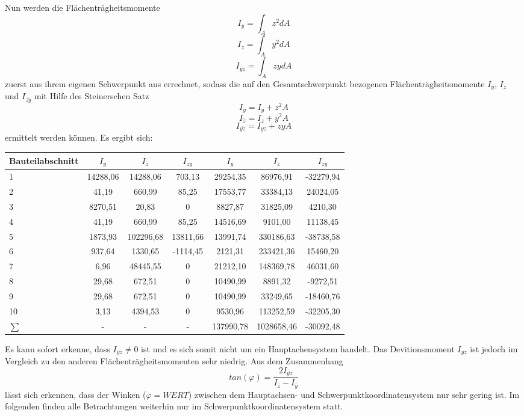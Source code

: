 Nun werden die Flächenträgheitsmomente 
\begin{equation}
	I_{y} = \int_{A}^{}z^2dA
\end{equation}
\begin{equation}
I_{z} = \int_{A}^{}y^2dA
\end{equation}
\begin{equation}
I_{yz} = \int_{A}^{}zydA
\end{equation}
 zuerst aus ihrem eigenen Schwerpunkt aus errechnet, sodass die auf den Gesamtschwerpunkt bezogenen Flächenträgheitsmomente $I_{\bar{y}}$, $I_{\bar{z}}$ und $I_{\bar{zy}}$ mit Hilfe des Steinerschen Satz
 \begin{equation}
 	I_{\bar{y}} = I_{y} + z^2A
 \end{equation}
\begin{equation}
I_{\bar{z}} = I_{z} + y^2A
\end{equation}
\begin{equation}
I_{\bar{yz}} = I_{yz} + zyA
\end{equation}
 ermittelt werden können.
Es ergibt sich:
\begin{center}

\begin{tabular}[h]{l|c|c|c||c|c|c}
Bauteilabschnitt&$I_{y}$&$I_{z}$&$I_{zy}$&$I_{\bar{y}}$&$I_{\bar{z}}$&$I_{\bar{zy}}$\\
\hline
1&14288,06&14288,06&703,13&29254,35&86976,91&-32279,94\\
2&41,19&660,99&85,25&17553,77&33384,13&24024,05\\
3&8270,51&20,83&0&8827,87&31825,09&4210,30\\
4&41,19&660,99&85,25&14516,69&9101,00&11138,45\\
5&1873,93&102296,68&13811,66&13991,74&330186,63&-38738,58\\
6&937,64&1330,65&-1114,45&2121,31&233421,36&15460,20\\
7&6,96&48445,55&0&21212,10&148369,78&46031,60\\
8&29,68&672,51&0&10490,99&8891,32&-9272,51\\
9&29,68&672,51&0&10490,99&33249,65&-18460,76\\
10&3,13&4394,53&0&9530,96&113252,59&-32205,30\\
\hline
$\sum{}$&-&-&-&137990,78&1028658,46&-30092,48
\end{tabular}
\end{center}
Es kann sofort erkenne, dass $I_{\bar{yz}} \neq 0$ ist und es sich somit nicht um ein Hauptachensystem handelt. Das Devitionsmoment  $I_{\bar{yz}}$ ist jedoch im Vergleich zu den anderen Flächenträgheitsmomenten sehr niedrig. 
Aus dem Zusammenhang
\begin{equation}
	tan(\varphi)=\frac{2I_{\bar{yz}}}{I_{\bar{z}}-I_{\bar{y}}}
\end{equation}
lässt sich erkennen, dass der Winken ($\varphi = WERT$) zwischen dem Hauptachsen- und Schwerpunktkoordinatensystem nur sehr gering ist. Im folgenden finden alle Betrachtungen weiterhin nur im Schwerpunktkoordinatensystem statt.

